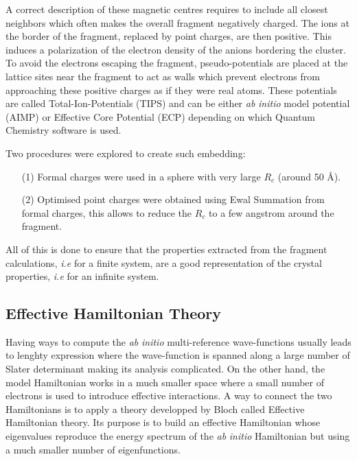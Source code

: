 \documentclass[10pt]{report}
\numberwithin{equation}{section}
\begin{document}
A correct description of these magnetic centres requires to include all closest neighbors which often makes the overall fragment negatively charged.
The ions at the border of the fragment, replaced by point charges, are then positive. This induces a polarization of the electron density of the anions bordering the cluster.
To avoid the electrons escaping the fragment, pseudo-potentials are placed at the lattice sites near the fragment to act as walls which prevent electrons from approaching these positive charges as if they were real atoms.
These potentials are called Total-Ion-Potentials (TIPS) and can be either \textit{ab} \textit{initio} model potential (AIMP) or Effective Core Potential (ECP) depending on which Quantum Chemistry software is used.

Two procedures were explored to create such embedding:
\begin{itemize}
    \item[(1)] Formal charges were used in a sphere with very large $R_c$ (around 50 \AA{}).
    \item[(2)] Optimised point charges were obtained using Ewal Summation from formal charges, this allows to reduce the $R_c$ to a few angstrom around the fragment.
\end{itemize}

All of this is done to ensure that the properties extracted from the fragment calculations, \textit{i.e} for a finite system, are a good representation of the crystal properties, \textit{i.e} for an infinite system.

\subsection{Effective Hamiltonian Theory}

Having ways to compute the \textit{ab} \textit{initio} multi-reference wave-functions usually leads to lenghty expression where the wave-function is spanned along a large number of Slater determinant making its analysis complicated.
On the other hand, the model Hamiltonian works in a much smaller space where a small number of electrons is used to introduce effective interactions.
A way to connect the two Hamiltonians is to apply a theory developped by Bloch called Effective Hamiltonian theory. 
Its purpose is to build an effective Hamiltonian whose eigenvalues reproduce the energy spectrum of the \textit{ab} \textit{initio} Hamiltonian but using a much smaller number of eigenfunctions.
\end{document}
